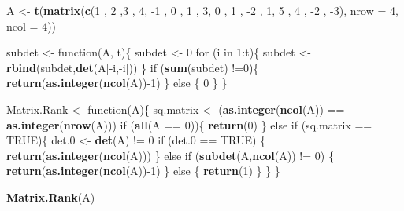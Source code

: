 \documentclass[]{article}
\newenvironment{Shaded}{\begin{snugshade}}{\end{snugshade}}
\newcommand{\KeywordTok}[1]{\textcolor[rgb]{0.13,0.29,0.53}{\textbf{{#1}}}}
\newcommand{\DataTypeTok}[1]{\textcolor[rgb]{0.13,0.29,0.53}{{#1}}}
\newcommand{\DecValTok}[1]{\textcolor[rgb]{0.00,0.00,0.81}{{#1}}}
\newcommand{\FloatTok}[1]{\textcolor[rgb]{0.00,0.00,0.81}{{#1}}}
\newcommand{\StringTok}[1]{\textcolor[rgb]{0.31,0.60,0.02}{{#1}}}
\newcommand{\OtherTok}[1]{\textcolor[rgb]{0.56,0.35,0.01}{{#1}}}
\newcommand{\NormalTok}[1]{{#1}}
\begin{document}
\begin{Shaded}
\begin{Highlighting}[]
\NormalTok{A <-}\StringTok{ }\KeywordTok{t}\NormalTok{(}\KeywordTok{matrix}\NormalTok{(}\KeywordTok{c}\NormalTok{(}\DecValTok{1} \NormalTok{, }\DecValTok{2} \NormalTok{,}\DecValTok{3} \NormalTok{, }\DecValTok{4}\NormalTok{, }
              \NormalTok{-}\DecValTok{1} \NormalTok{, }\DecValTok{0} \NormalTok{, }\DecValTok{1} \NormalTok{, }\DecValTok{3}\NormalTok{, }
              \DecValTok{0} \NormalTok{, }\DecValTok{1} \NormalTok{, -}\DecValTok{2} \NormalTok{, }\DecValTok{1}\NormalTok{, }
              \DecValTok{5} \NormalTok{, }\DecValTok{4} \NormalTok{, -}\DecValTok{2} \NormalTok{, -}\DecValTok{3}\NormalTok{), }\DataTypeTok{nrow =} \DecValTok{4}\NormalTok{, }\DataTypeTok{ncol =} \DecValTok{4}\NormalTok{))}

\NormalTok{subdet <-}\StringTok{ }\NormalTok{function(A, t)\{}
            \NormalTok{subdet <-}\StringTok{ }\DecValTok{0}
           \NormalTok{for (i in }\DecValTok{1}\NormalTok{:t)\{}
             \NormalTok{subdet <-}\StringTok{ }\KeywordTok{rbind}\NormalTok{(subdet,}\KeywordTok{det}\NormalTok{(A[-i,-i]))}
           \NormalTok{\}}
           \NormalTok{if (}\KeywordTok{sum}\NormalTok{(subdet) !=}\DecValTok{0}\NormalTok{)\{}
             \KeywordTok{return}\NormalTok{(}\KeywordTok{as.integer}\NormalTok{(}\KeywordTok{ncol}\NormalTok{(A))-}\DecValTok{1}\NormalTok{)}
           \NormalTok{\} else \{}
             \DecValTok{0}
           \NormalTok{\}}
\NormalTok{\}}

\NormalTok{Matrix.Rank <-}\StringTok{ }\NormalTok{function(A)\{}
               \NormalTok{sq.matrix <-}\StringTok{ }\NormalTok{(}\KeywordTok{as.integer}\NormalTok{(}\KeywordTok{ncol}\NormalTok{(A)) ==}\StringTok{ }\KeywordTok{as.integer}\NormalTok{(}\KeywordTok{nrow}\NormalTok{(A)))}
               \NormalTok{if (}\KeywordTok{all}\NormalTok{(A ==}\StringTok{ }\DecValTok{0}\NormalTok{))\{}
                 \KeywordTok{return}\NormalTok{(}\DecValTok{0}\NormalTok{)}
               \NormalTok{\} else if (sq.matrix ==}\StringTok{ }\OtherTok{TRUE}\NormalTok{)\{}
                 \NormalTok{det}\FloatTok{.0} \NormalTok{<-}\StringTok{ }\KeywordTok{det}\NormalTok{(A) !=}\StringTok{ }\DecValTok{0}
                 \NormalTok{if (det}\FloatTok{.0} \NormalTok{==}\StringTok{ }\OtherTok{TRUE}\NormalTok{) \{}
                 \KeywordTok{return}\NormalTok{(}\KeywordTok{as.integer}\NormalTok{(}\KeywordTok{ncol}\NormalTok{(A)))}
                 \NormalTok{\} else if (}\KeywordTok{subdet}\NormalTok{(A,}\KeywordTok{ncol}\NormalTok{(A)) !=}\StringTok{ }\DecValTok{0}\NormalTok{) \{}
                  \KeywordTok{return}\NormalTok{(}\KeywordTok{as.integer}\NormalTok{(}\KeywordTok{ncol}\NormalTok{(A))-}\DecValTok{1}\NormalTok{)}
                 \NormalTok{\} else \{}
                     \KeywordTok{return}\NormalTok{(}\DecValTok{1}\NormalTok{)}
                   \NormalTok{\}}
                 \NormalTok{\}}
               \NormalTok{\}}

\KeywordTok{Matrix.Rank}\NormalTok{(A)}
\end{Highlighting}
\end{Shaded}
\end{document}
